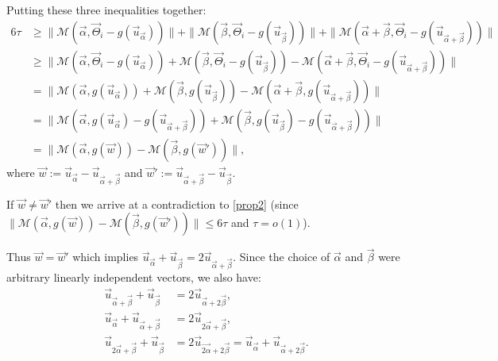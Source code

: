 \documentclass[11pt]{article}
\renewcommand{\ge}{ \geqslant}
\renewcommand{\le}{ \leqslant}
\renewcommand{\kappa}{\tau}
\newcommand{\M}{\mathcal{M}}
\begin{document}
Putting these three inequalities together:
\begin{align*}
 6\kappa&\ge \|\M(  \vec{\alpha},\vec{\Theta}_i-g(\vec{u}_{\vec{\alpha}})) \|+\|\M(  \vec{\beta},\vec{\Theta}_i-g(\vec{u}_{\vec{\beta}})) \|+\|\M(  \vec{\alpha}+\vec{\beta},\vec{\Theta}_i-g(\vec{u}_{\vec{\alpha}+\vec{\beta}})) \|\\
  &\ge\|\M(  \vec{\alpha},\vec{\Theta}_i-g(\vec{u}_{\vec{\alpha}})) +\M(  \vec{\beta},\vec{\Theta}_i-g(\vec{u}_{\vec{\beta}})) -\M(  \vec{\alpha}+\vec{\beta},\vec{\Theta}_i-g(\vec{u}_{\vec{\alpha}+\vec{\beta}})) \|\\
  &=\|\M(  \vec{\alpha},g(\vec{u}_{\vec{\alpha}})) +\M(  \vec{\beta},g(\vec{u}_{\vec{\beta}})) -\M(  \vec{\alpha}+\vec{\beta},g(\vec{u}_{\vec{\alpha}+\vec{\beta}})) \|\\
    &=\|\M(  \vec{\alpha},g(\vec{u}_{\vec{\alpha}})-g(\vec{u}_{\vec{\alpha}+\vec{\beta}})) +\M(  \vec{\beta},g(\vec{u}_{\vec{\beta}})-g(\vec{u}_{\vec{\alpha}+\vec{\beta}})) \|\\
      &=\|\M(  \vec{\alpha},g(\vec{w})) -\M(  \vec{\beta},g(\vec{w}')) \|,
\end{align*}
where $\vec{w}:=\vec{u}_{\vec{\alpha}}-\vec{u}_{\vec{\alpha}+\vec{\beta}}$ and $\vec{w}':=\vec{u}_{\vec{\alpha}+\vec{\beta}}-\vec{u}_{\vec{\beta}}$.

 

If $\vec{w}\neq\vec{w}'$ then  we arrive at a  contradiction  to \eqref{prop2} (since $\|\M(  \vec{\alpha},g(\vec{w}))-\M(  \vec{\beta},g(\vec{w}')) \|\le 6\kappa$ and $\kappa=o(1)$). 



Thus $\vec{w}=\vec{w}'$ which implies $\vec{u}_{\vec{\alpha}}+\vec{u}_{\vec{\beta}}=2\vec{u}_{\vec{\alpha}+\vec{\beta}}$. Since the choice of $\vec{\alpha}$ and $\vec{\beta}$ were arbitrary  linearly independent  vectors, we also have:
\begin{align*}
\vec{u}_{\vec{\alpha}+\vec{\beta}}+\vec{u}_{\vec{\beta}}&=2\vec{u}_{\vec{\alpha}+2\vec{\beta}},\\ \vec{u}_{\vec{\alpha}}+\vec{u}_{\vec{\alpha}+\vec{\beta}}&=2\vec{u}_{2\vec{\alpha}+\vec{\beta}},
\\ \vec{u}_{2\vec{\alpha}+\vec{\beta}}+\vec{u}_{\vec{\beta}}&=2\vec{u}_{\vec{2\alpha}+2\vec{\beta}}=\vec{u}_{\vec{\alpha}}+\vec{u}_{\vec{\alpha}+2\vec{\beta}}.
\end{align*}  
\end{document}
